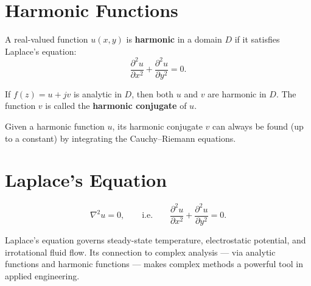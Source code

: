 \section{Harmonic Functions}

\begin{definition}
A real-valued function $u(x,y)$ is \textbf{harmonic} in a domain $D$ if it satisfies
Laplace's equation:
\[
  \frac{\partial^2 u}{\partial x^2} + \frac{\partial^2 u}{\partial y^2} = 0.
\]
\end{definition}

\begin{theorem}
If $f(z) = u + jv$ is analytic in $D$, then both $u$ and $v$ are harmonic in $D$.
The function $v$ is called the \textbf{harmonic conjugate} of $u$.
\end{theorem}

\begin{remark}
Given a harmonic function $u$, its harmonic conjugate $v$ can always be found (up to a
constant) by integrating the Cauchy--Riemann equations.
\end{remark}

\section{Laplace's Equation}

\begin{definition}
\[
  \nabla^2 u = 0, \qquad \text{i.e.} \qquad
  \frac{\partial^2 u}{\partial x^2} + \frac{\partial^2 u}{\partial y^2} = 0.
\]
\end{definition}

\begin{remark}
Laplace's equation governs steady-state temperature, electrostatic potential, and
irrotational fluid flow. Its connection to complex analysis — via analytic functions
and harmonic functions — makes complex methods a powerful tool in applied engineering.
\end{remark}
